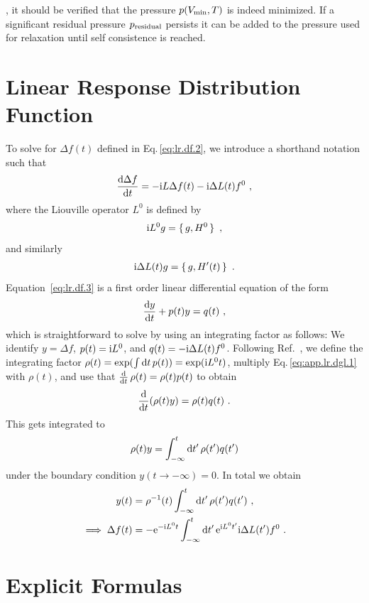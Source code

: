 , it should be verified that the pressure $p (V_{\rm min}, T)$ is indeed minimized. If a significant residual pressure $p_{\rm residual}$ persists it can be added to the pressure used for relaxation until self consistence is reached.

\chapter{Linear Response Distribution Function}
\label{app:lr.f}
To solve for $\Delta f(t)$ defined in Eq.\,\eqref{eq:lr.df.2}, we introduce a shorthand notation such that
\begin{align}
\frac{\d \Delta f}{\d t} = -\im L \Delta f(t) - \im \Delta L (t) f^0~,
\label{eq:lr.df.3}
\end{align}
where the Liouville operator $L^0$ is defined by
\begin{align}
	\im L^0 g = \set{g, H^0}~,
	\label{eq:app.lr.L}
\end{align}
and similarly
\begin{align}
	\im \Delta L (t) g = \set{g, H'(t)}~.
	\label{eq:app.lr.L'}
\end{align}
Equation~\eqref{eq:lr.df.3} is a first order linear differential equation of the form
\begin{align}
	\frac{\d y}{\d t} + p(t) y = q(t)~,
	\label{eq:app.lr.dgl.1}
\end{align}
which is straightforward to solve by using an integrating factor as follows: We identify $y = \Delta f$, $p(t) = {\rm i} L^0$, and $q(t) = - {\rm i} \Delta L (t) f^0$. Following Ref.~\cite[p.\,68]{Lomen1986}, we define the integrating factor \mbox{$\rho (t) = \exp(\int {\rm d} t \, p (t)) = \exp ({\rm i} L^0 t)$}, multiply Eq.\,\eqref{eq:app.lr.dgl.1} with $\rho (t)$, and use that \mbox{$\frac{{\rm d}}{{\rm d} t} \, \rho(t) = \rho(t) p(t)$} to obtain
$$
\frac{{\rm d}}{{\rm d} t} (\rho (t) y) = \rho(t) q(t)~.
$$
This gets integrated to
$$
\rho(t) y = \int_{-\infty}^t {\rm d} t' \, \rho(t') q(t')
$$
under the boundary condition $y (t \to -\infty) = 0$. In total we obtain
\begin{align}
  y(t) 
    &= \rho^{-1} (t) \int_{-\infty}^t {\rm d} t' \, \rho(t') q(t')~, \\
  \implies
  \Delta f(t) 
    &= - {\rm e}^{- {\rm i} L^0 t}  \int_{-\infty}^t {\rm d} t' \, {\rm e}^{{\rm i} L^0 t'} {\rm i} \Delta L (t') f^0~.
\end{align}

\chapter{Explicit Formulas}
